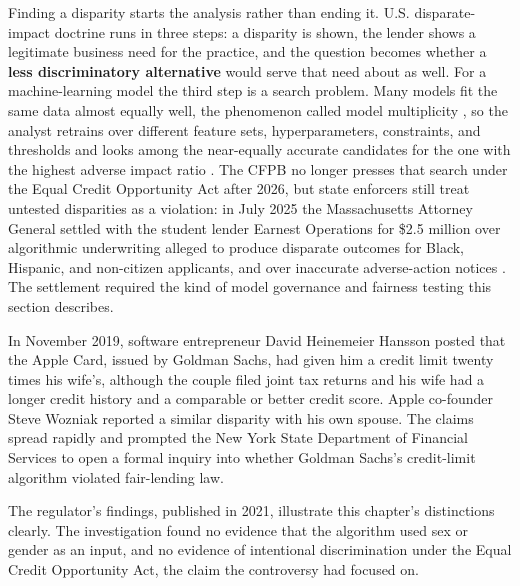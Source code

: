 \documentclass[../ai_in_finance]{subfiles}
\begin{document}
Finding a disparity starts the analysis rather than ending it. U.S. disparate-impact doctrine runs in three steps: a disparity is shown, the lender shows a legitimate business need for the practice, and the question becomes whether a \textbf{less discriminatory alternative} would serve that need about as well. For a machine-learning model the third step is a search problem. Many models fit the same data almost equally well, the phenomenon called model multiplicity \parencite{black2022model}, so the analyst retrains over different feature sets, hyperparameters, constraints, and thresholds and looks among the near-equally accurate candidates for the one with the highest adverse impact ratio \parencite{gillis2024operationalizing}. The CFPB no longer presses that search under the Equal Credit Opportunity Act after 2026, but state enforcers still treat untested disparities as a violation: in July 2025 the Massachusetts Attorney General settled with the student lender Earnest Operations for \$2.5 million over algorithmic underwriting alleged to produce disparate outcomes for Black, Hispanic, and non-citizen applicants, and over inaccurate adverse-action notices \parencite{massag2025earnest}. The settlement required the kind of model governance and fairness testing this section describes.

\label{sec:apple-card-vignette}

In November 2019, software entrepreneur David Heinemeier Hansson posted that the Apple Card, issued by Goldman Sachs, had given him a credit limit twenty times his wife's, although the couple filed joint tax returns and his wife had a longer credit history and a comparable or better credit score. Apple co-founder Steve Wozniak reported a similar disparity with his own spouse. The claims spread rapidly and prompted the New York State Department of Financial Services to open a formal inquiry into whether Goldman Sachs's credit-limit algorithm violated fair-lending law.

The regulator's findings, published in 2021, illustrate this chapter's distinctions clearly. The investigation found no evidence that the algorithm used sex or gender as an input, and no evidence of intentional discrimination under the Equal Credit Opportunity Act, the claim the controversy had focused on.
\end{document}

